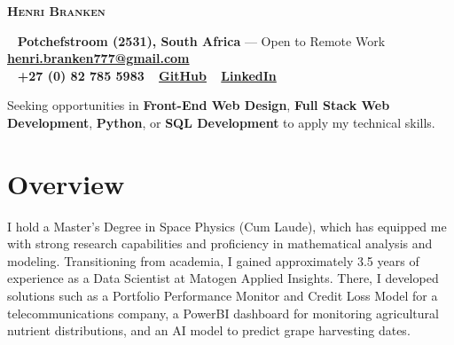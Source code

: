 \documentclass[a4paper,10pt]{article}
\begin{document}
\begin{center}
	{\Huge\textbf{\textsc{\textcolor{burnt}{Henri Branken}}}}\\[0.5cm]
\end{center}
\begin{tcolorbox}[
	colback=teal!10, %
	colframe=teal,   %
	boxrule=1pt, %
	width=\textwidth,
	left=10pt, right=10pt, %
	sharp corners=northwest
	]
	\begin{center}
		\faHome~ \textbf{Potchefstroom (2531), South Africa} --- Open to Remote Work \quad \faEnvelope~ \href{mailto:henri.branken777@gmail.com}{\textbf{henri.branken777@gmail.com}} \quad\\ \faPhone~ \textbf{+27 (0) 82 785 5983} \quad \faGithub~ \href{https://github.com/HenriBranken}{\textbf{GitHub}} \quad
		\faLinkedin~ \href{https://www.linkedin.com/in/henri-branken-1423a2153/}{\textbf{LinkedIn}}
	\end{center}
\end{tcolorbox}

\begin{tcolorbox}[
	colback=burntshade,    %
	colframe=burnt,     %
	boxrule=1pt,        %
	sharp corners=northwest,
	rounded corners=southwest,
	coltitle=white,     %
	fonttitle=\large\bfseries\scshape,  %
	title=Career Objective,
	width=\textwidth,   %
	left=10pt, right=10pt, top=5pt, bottom=5pt  %
	]
	Seeking opportunities in \textbf{Front-End Web Design}, \textbf{Full Stack Web Development}, \textbf{Python}, or \textbf{SQL Development} to apply my technical skills.
\end{tcolorbox}

\section*{Overview}
I hold a Master's Degree in Space Physics (Cum Laude), which has equipped me with strong research capabilities and proficiency in mathematical analysis and modeling. Transitioning from academia, I gained approximately 3.5 years of experience as a Data Scientist at Matogen Applied Insights. There, I developed solutions such as a Portfolio Performance Monitor and Credit Loss Model for a telecommunications company, a PowerBI dashboard for monitoring agricultural nutrient distributions, and an AI model to predict grape harvesting dates.
\end{document}
